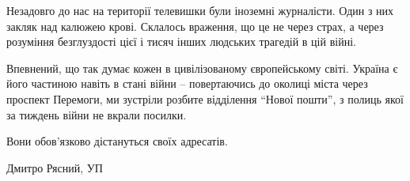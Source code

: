 Незадовго до нас на території телевишки були іноземні журналісти. Один з них
закляк над калюжею крові. Склалось враження, що це не через страх, а через
розуміння безглуздості цієї і тисяч інших людських трагедій в цій війні.


Впевнений, що так думає кожен в цивілізованому європейському світі. Україна є
його частиною навіть в стані війни – повертаючись до околиці міста через
проспект Перемоги, ми зустріли розбите відділення \enquote{Нової пошти}, з полиць якої
за тиждень війни не вкрали посилки. 

Вони обов'язково дістануться своїх адресатів. 


Дмитро Рясний, УП
